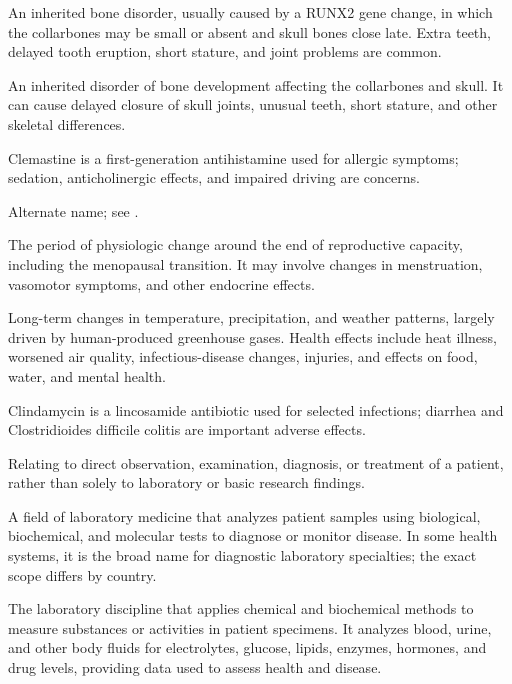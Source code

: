  An inherited bone disorder, usually caused by a RUNX2 gene change, in which the collarbones may be small or absent and skull bones close late. Extra teeth, delayed tooth eruption, short stature, and joint problems are common.

 An inherited disorder of bone development affecting the collarbones and skull. It can cause delayed closure of skull joints, unusual teeth, short stature, and other skeletal differences.

 Clemastine is a first-generation antihistamine used for allergic symptoms; sedation, anticholinergic effects, and impaired driving are concerns.

 Alternate name; see .

 The period of physiologic change around the end of reproductive capacity, including the
menopausal transition. It may involve changes in menstruation, vasomotor symptoms, and
other endocrine effects.

 Long-term changes in temperature, precipitation, and weather patterns, largely driven by human-produced greenhouse gases. Health effects include heat illness, worsened air quality, infectious-disease changes, injuries, and effects on food, water, and mental health.

 Clindamycin is a lincosamide antibiotic used for selected infections; diarrhea and Clostridioides difficile colitis are important adverse effects.

 Relating to direct observation, examination, diagnosis, or treatment of a patient, rather than solely to laboratory or basic research findings.

 A field of laboratory medicine that analyzes patient samples using biological, biochemical, and molecular tests to diagnose or monitor disease. In some health systems, it is the broad name for diagnostic laboratory specialties; the exact scope differs by country.

 The laboratory discipline that applies chemical and
biochemical methods to measure substances or activities in patient specimens.
It analyzes blood, urine, and other body fluids for electrolytes, glucose, lipids,
enzymes, hormones, and drug levels, providing data used to assess health and disease.

